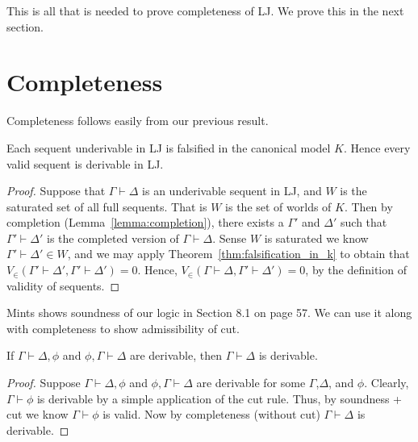 \documentclass{article}
\begin{document}
\noindent
This is all that is needed to prove completeness of LJ.  We prove this in the next section.

\section{Completeness}
\label{sec:completeness}
Completeness follows easily from our previous result.  
\begin{thm}[Completeness]
  \label{thm:completeness}
  Each sequent underivable in LJ is falsified in the canonical model $K$.  Hence
  every valid sequent is derivable in LJ.
\end{thm}
\begin{proof}
  Suppose that $\Gamma \vdash \Delta$ is an underivable sequent in LJ, and $W$ is the saturated set of all full sequents.
  That is $W$ is the set of worlds of $K$. Then by completion (Lemma~\ref{lemma:completion}),
  there exists a $\Gamma'$ and $\Delta'$ such that $\Gamma' \vdash \Delta'$ is the completed version of $\Gamma \vdash \Delta$. 
  Sense $W$ is saturated we know $\Gamma' \vdash \Delta' \in W$, and we may apply Theorem~\ref{thm:falsification_in_k} to obtain
  that $V_\in(\Gamma' \vdash \Delta', \Gamma' \vdash \Delta') = 0$.  Hence, 
  $V_\in(\Gamma \vdash \Delta, \Gamma' \vdash \Delta') = 0$, by the definition of validity of sequents.
\end{proof}
Mints shows soundness of our logic in Section 8.1 on page 57.  We can use it along with completeness to show admissibility of
cut.  
\begin{corollary}
  \label{corollary:admissibility_of_cut}
  If $\Gamma \vdash \Delta, \phi$ and $\phi, \Gamma \vdash \Delta$ are derivable, then $\Gamma \vdash \Delta$ is derivable.
\end{corollary}
\begin{proof}
  Suppose $\Gamma \vdash \Delta, \phi$ and $\phi, \Gamma \vdash \Delta$ are derivable for some $\Gamma$,$\Delta$, and $\phi$.
  Clearly, $\Gamma \vdash \phi$ is derivable by a simple application of the cut rule.  Thus, by soundness + cut we know 
  $\Gamma \vdash \phi$ is valid.  Now by completeness (without cut) $\Gamma \vdash \Delta$ is derivable. 
\end{proof}
\end{document}
